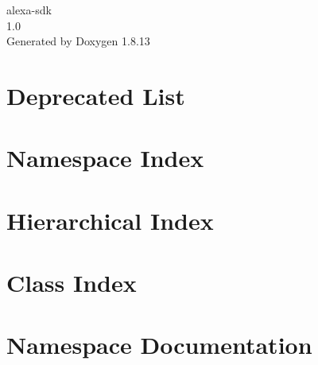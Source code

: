 \documentclass[twoside]{book}
\newcommand{\+}{\discretionary{\mbox{\scriptsize$\hookleftarrow$}}{}{}}
\newcommand{\clearemptydoublepage}{%
  \newpage{\pagestyle{empty}\cleardoublepage}%
}
\begin{document}
\hypersetup{pageanchor=false,
             bookmarksnumbered=true,
             pdfencoding=unicode
            }
\begin{titlepage}
\vspace*{7cm}
\begin{center}%
{\Large alexa-\/sdk \\[1ex]\large 1.\+0 }\\
\vspace*{1cm}
{\large Generated by Doxygen 1.8.13}\\
\end{center}
\end{titlepage}
\clearemptydoublepage
{}
\tableofcontents
\clearemptydoublepage
{}
\hypersetup{pageanchor=true}

\chapter{Deprecated List}
\label{deprecated}

\chapter{Namespace Index}

\chapter{Hierarchical Index}

\chapter{Class Index}

\chapter{Namespace Documentation}


\end{document}
